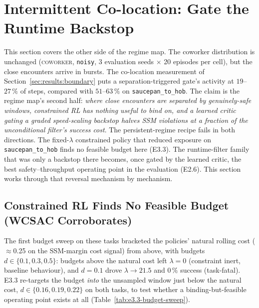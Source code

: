 \documentclass[11pt,a4paper]{report}
\newcommand{\ssm}{SSM}
\newcommand{\coworker}{\textsc{coworker}}
\begin{document}
\section{Intermittent Co-location: Gate the Runtime Backstop}
\label{sec:results:r2}

This section covers the other side of the regime map. The coworker
distribution is unchanged (\coworker{}, \texttt{noisy}, 3 evaluation
seeds $\times$ 20 episodes per cell), but the close encounters arrive
in bursts. The co-location measurement of
Section~\ref{sec:results:boundary} puts a separation-triggered gate's
activity at $19$--$27\,\%$ of steps, compared with $51$--$63\,\%$ on
\texttt{saucepan\_to\_hob}. The claim is the regime map's second half: \emph{where close
encounters are separated by genuinely-safe windows, constrained RL has
nothing useful to bind on, and a learned critic gating a graded
speed-scaling backstop halves \ssm{} violations at a fraction of the
unconditional filter's success cost}. The persistent-regime recipe
fails in both directions. The fixed-$\lambda$ constrained policy that
reduced exposure on \texttt{saucepan\_to\_hob} finds no feasible budget
here (E3.3). The
runtime-filter family that was only a backstop there becomes, once
gated by the learned critic, the best safety--throughput operating
point in the evaluation (E2.6). This section works through that
reversal mechanism by mechanism.

\subsection{Constrained RL Finds No Feasible Budget (WCSAC Corroborates)}
\label{sec:results:r2-lagrangian}

The first budget sweep on these tasks bracketed the policies' natural
rolling cost ($\approx$0.25 on the \ssm{}-margin cost signal) from
above, with budgets $d \in \{0.1, 0.3, 0.5\}$: budgets above the
natural cost left $\lambda = 0$ (constraint inert, baseline
behaviour), and $d = 0.1$ drove $\lambda \to 21.5$ and $0\,\%$
success (task-fatal). E3.3 re-targets the budget \emph{into} the
unsampled window just below the natural cost,
$d \in \{0.16, 0.19, 0.22\}$ on both tasks, to test whether a
binding-but-feasible operating point exists at all
(Table~\ref{tab:e3.3-budget-sweep}).
\end{document}
